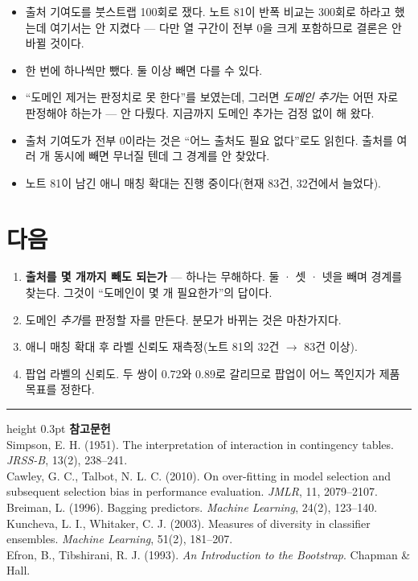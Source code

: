 \documentclass[10pt]{article}
\begin{document}
\begin{itemize}[leftmargin=1.1em,itemsep=0.15em]
\item 출처 기여도를 붓스트랩 100회로 쟀다. 노트 81이 반폭 비교는 300회로
      하라고 했는데 여기서는 안 지켰다 --- 다만 열 구간이 전부 0을 크게
      포함하므로 결론은 안 바뀔 것이다.
\item 한 번에 하나씩만 뺐다. 둘 이상 빼면 다를 수 있다.
\item ``도메인 제거는 판정치로 못 한다''를 보였는데, 그러면 \emph{도메인 추가}는
      어떤 자로 판정해야 하는가 --- 안 다뤘다. 지금까지 도메인 추가는 검정 없이
      해 왔다.
\item 출처 기여도가 전부 0이라는 것은 ``어느 출처도 필요 없다''로도 읽힌다.
      출처를 여러 개 동시에 빼면 무너질 텐데 그 경계를 안 찾았다.
\item 노트 81이 남긴 애니 매칭 확대는 진행 중이다(현재 83건, 32건에서 늘었다).
\end{itemize}

\section{다음}

\begin{enumerate}[leftmargin=1.3em,itemsep=0.15em]
\item \textbf{출처를 몇 개까지 빼도 되는가} --- 하나는 무해하다. 둘 · 셋 · 넷을
      빼며 경계를 찾는다. 그것이 ``도메인이 몇 개 필요한가''의 답이다.
\item 도메인 \emph{추가}를 판정할 자를 만든다. 분모가 바뀌는 것은 마찬가지다.
\item 애니 매칭 확대 후 라벨 신뢰도 재측정(노트 81의 32건 $\to$ 83건 이상).
\item 팝업 라벨의 신뢰도. 두 쌍이 0.72와 0.89로 갈리므로 팝업이 어느 쪽인지가
      제품 목표를 정한다.
\end{enumerate}

\vspace{0.6em}
\hrule height 0.3pt
\vspace{0.5em}
{\footnotesize
\textbf{참고문헌}\\[0.3em]
Simpson, E. H. (1951). The interpretation of interaction in contingency tables.
\emph{JRSS-B}, 13(2), 238--241.\\[0.15em]
Cawley, G. C., Talbot, N. L. C. (2010). On over-fitting in model selection and
subsequent selection bias in performance evaluation. \emph{JMLR}, 11, 2079--2107.\\[0.15em]
Breiman, L. (1996). Bagging predictors. \emph{Machine Learning}, 24(2), 123--140.\\[0.15em]
Kuncheva, L. I., Whitaker, C. J. (2003). Measures of diversity in classifier
ensembles. \emph{Machine Learning}, 51(2), 181--207.\\[0.15em]
Efron, B., Tibshirani, R. J. (1993). \emph{An Introduction to the Bootstrap}.
Chapman \& Hall.
}
\end{document}
